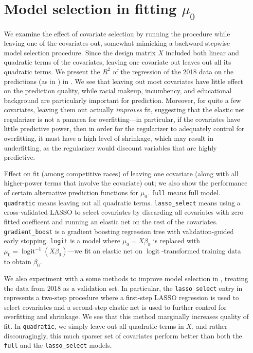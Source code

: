 \documentclass[12pt, letterpaper]{article}
\newcommand{\logit}{\operatorname{logit}}
\begin{document}
\section{Model selection in fitting $\mu_0$}
We examine the effect of covariate selection by running the procedure while leaving one of the covariates out, somewhat mimicking a backward stepwise model selection procedure. Since the design matrix $X$ included both linear and quadratic terms of the covariates, leaving one covariate out leaves out all its quadratic terms. We present the $R^2$ of the regression of the 2018 data on the predictions (as in ) in . We see that leaving out most covariates have little effect on the prediction quality, while racial makeup, incumbency, and educational background are particularly important for prediction. Moreover, for quite a few covariates, leaving them out actually \emph{improves} fit, suggesting that the elastic net regularizer is not a panacea for overfitting---in particular, if the covariates have little predictive power, then in order for the regularizer to adequately control for overfitting, it must have a high level of shrinkage, which may result in underfitting, as the regularizer would discount variables that are highly predictive.

\begin{table}[tbh]
  \caption{Effect on fit (among competitive races) of leaving one covariate (along with all higher-power terms that involve the covariate) out; we also show the performance of certain alternative prediction functions for $\mu_0$. \texttt{full} means full model. \texttt{quadratic} means leaving out all quadratic terms. \texttt{lasso\_select} means using a cross-validated LASSO to select covariates by discarding all covariates with zero fitted coefficent and running an elastic net on the rest of the covariates. \texttt{gradient\_boost} is a gradient boosting regression tree with validation-guided early stopping. \texttt{logit} is a model where $\mu_0 = X\beta_0$ is replaced with $\mu_0 = \logit^{-1}(X\beta_0)$---we fit an elastic net on $\logit$-transformed training data to obtain $\beta_0$.}
  \label{tab:leave_out}
  \centering
  \vspace{1em}
  
\end{table}

We also experiment with a some methods to improve model selection in , treating the data from 2018 as a validation set. In particular, the \texttt{lasso\_select} entry in  represents a two-step procedure where a first-step LASSO regression is used to select covariates and a second-step elastic net is used to further control for overfitting and shrinkage. We see that this method marginally increases quality of fit. In \texttt{quadratic}, we simply leave out all quadratic terms in $X$, and rather discouragingly, this much sparser set of covariates perform better than both the \texttt{full} and the \texttt{lasso\_select} models. 
\end{document}
